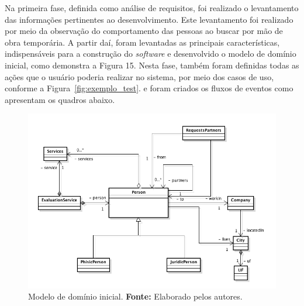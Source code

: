 \par Na primeira fase, definida como análise de requisitos, foi realizado o levantamento das informações pertinentes ao desenvolvimento. Este levantamento foi realizado por meio da observação do comportamento das pessoas ao buscar por mão de obra temporária. A partir daí, foram levantadas as principais características, indispensáveis para a construção do \textit{software} e desenvolvido o modelo de domínio inicial, como demonstra a Figura 15. Nesta fase, também foram definidas todas as ações que o usuário poderia realizar no sistema, por meio dos casos de uso, conforme a Figura~\ref{fig:exemplo_test}. e foram criados os fluxos de eventos como apresentam os quadros abaixo.

\newpage
\begin{figure}[h!]
	\centerline{\includegraphics[scale=0.45]{./imagens/modelo-dominio-inicial.png}}
	\caption[Modelo de domínio inicial]
	{Modelo de domínio inicial. \textbf{Fonte:} Elaborado pelos autores.}
	\label{fig:exemplo1}
\end{figure}


